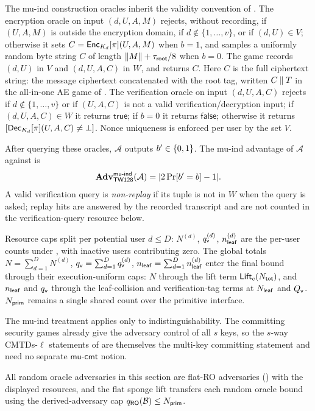 The mu-ind construction oracles inherit the validity convention of
. The encryption oracle on input $(d, U, A, M)$
rejects, without recording, if $(U, A, M)$ is outside the \TW{} encryption
domain, if $d \notin \{1, \dots, v\}$, or if $(d, U) \in V$; otherwise
it sets $C = \mathsf{Enc}_{K_d}[\pi](U, A, M)$ when $b = 1$, and samples a
uniformly random byte string $C$ of length $\|M\| + \tau_{\mathsf{root}}/8$ when
$b = 0$. The game records
$(d, U)$ in $V$ and $(d, U, A, C)$ in $W$, and returns $C$. Here $C$ is
the full ciphertext string: the message ciphertext concatenated with the
root tag, written $C \mathbin{\|} T$ in the all-in-one AE game of
. The
verification oracle on input $(d, U, A, C)$ rejects if $d \notin
\{1, \dots, v\}$ or if $(U, A, C)$ is not a valid \TW{}
verification/decryption input; if $(d, U, A, C) \in W$ it returns
$\mathsf{true}$; if $b = 0$ it returns $\mathsf{false}$; otherwise it
returns $[\mathsf{Dec}_{K_d}[\pi](U, A, C) \neq \bot]$. Nonce uniqueness is
enforced per user by the set $V$.

After querying these oracles, $\mathcal{A}$ outputs $b' \in \{0,1\}$.
The mu-ind advantage of $\mathcal{A}$ against \TW{} is
\[
  \mathbf{Adv}^{\mathsf{mu\text{-}ind}}_{\textsf{TW128}}(\mathcal{A})
  = |2 \Pr[b' = b] - 1|.
\]
A valid verification query is \emph{non-replay} if its tuple is not in
$W$ when the query is asked; replay hits are answered by the recorded
transcript and are not counted in the verification-query resource below.

Resource caps split per potential user $d \leq D$: $N^{(d)}$,
$q_{\mathsf{v}}^{(d)}$, $n_{\mathsf{leaf}}^{(d)}$ are the per-user counts under
, with inactive users contributing zero. The global
totals $N = \sum_{d=1}^D N^{(d)}$, $q_{\mathsf{v}} = \sum_{d=1}^D q_{\mathsf{v}}^{(d)}$,
$n_{\mathsf{leaf}} = \sum_{d=1}^D n_{\mathsf{leaf}}^{(d)}$ enter the final bound through their
execution-uniform caps: $N$ through the lift term $\mathsf{Lift}_c(N_{\mathsf{tot}})$, and
$n_{\mathsf{leaf}}$ and $q_{\mathsf{v}}$ through the leaf-collision and verification-tag terms
at $N_{\mathsf{leaf}}$ and $Q_{\mathsf{v}}$. $N_{\mathsf{prim}}$
remains a single shared count over the primitive interface.

The mu-ind treatment applies only to indistinguishability. The
committing security games already give the adversary control of all
$s$ keys, so the $s$-way CMTDs-$\ell$ statements of
 are themselves the multi-key committing statement
and need no separate $\mathsf{mu\text{-}cmt}$ notion.

All random oracle adversaries in this section are flat-RO adversaries
() with the displayed resources, and the flat sponge lift
transfers each random oracle bound using the derived-adversary cap
$q_{\mathsf{RO}}(\mathcal{B}) \leq N_{\mathsf{prim}}$.


